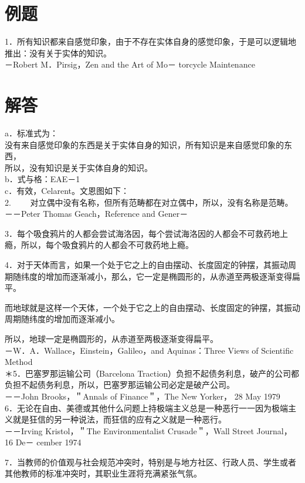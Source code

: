 \section*{例题}
1．所有知识都来自感觉印象，由于不存在实体自身的感觉印象，于是可以逻辑地推出：没有关于实体的知识。\\
－Robert M．Pirsig，Zen and the Art of Mo－ torcycle Maintenance

\section*{解答}
a．标准式为：\\
没有来自感觉印象的东西是关于实体自身的知识，所有知识是来自感觉印象的东西，\\
所以，没有知识是关于实体自身的知识。\\
b．式与格：EAE－1\\
c．有效，Celarent。文恩图如下：\\
2. $\qquad$对立偶中没有名称，但所有范畴都在对立偶中，所以，没有名称是范畴。\\
－－Peter Thomas Geach，Reference and Gener－

3．每个吸食鸦片的人都会尝试海洛因，每个尝试海洛因的人都会不可救药地上瘾，所以，每个吸食鸦片的人都会不可救药地上瘾。

4．对于天体而言，如果一个处于它之上的自由摆动、长度固定的钟摆，其振动周期随纬度的增加而逐渐减小，那么，它一定是椭圆形的，从赤道至两极逐渐变得扁平。

而地球就是这样一个天体，一个处于它之上的自由摆动、长度固定的钟摆，其振动周期随纬度的增加而逐渐减小。

所以，地球一定是椭圆形的，从赤道至两极逐渐变得扁平。\\
－W．A．Wallace，Einstein，Galileo，and Aquinas：Three Views of Scientific Method\\
＊5．巴塞罗那运输公司（Barcelona Traction）负担不起债务利息，破产的公司都负担不起债务利息，所以，巴塞罗那运输公司必定是破产公司。\\
－－John Brooks，＂Annals of Finance＂，The New Yorker， 28 May 1979\\
6．无论在自由、美德或其他什么问题上持极端主义总是一种恶行一一因为极端主义就是狂信的另一种说法，而狂信的应有之义就是一种恶行。\\
－－Irving Kristol，＂The Environmentalist Crusade＂，Wall Street Journal， 16 De－ cember 1974

7．当教师的价值观与社会规范冲突时，特别是与地方社区、行政人员、学生或者其他教师的标准冲突时，其职业生涯将充满紧张气氛。

